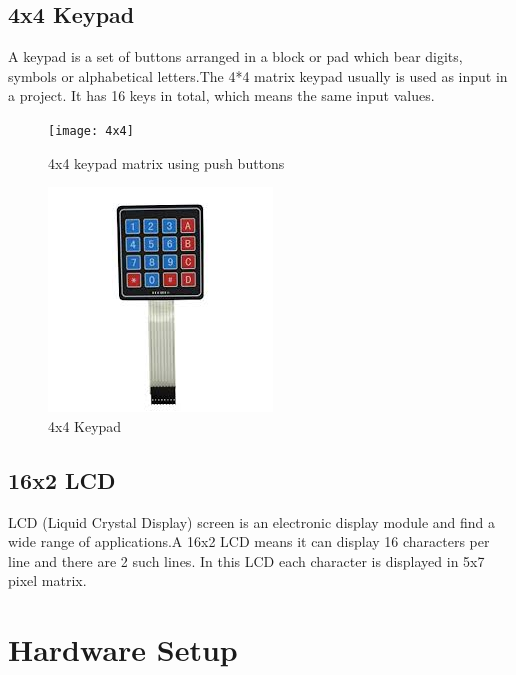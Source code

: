 \documentclass[11pt]{article}
\begin{document}
	\subsection{4x4 Keypad}	
		A keypad is a set of buttons arranged in a block or pad which bear digits, symbols or alphabetical letters.The 4*4 matrix keypad usually is used as input in a project. It has 16 keys in total, which means the same input values.
\begin{figure}[h]
	\begin{minipage}[b]{.5\linewidth}
		\centering
		\texttt{[image: 4x4]}
		\caption{ 4x4 keypad matrix using push buttons}
		\label{fig:1}
	\end{minipage}
  	\hspace{0.5cm}	
	\begin{minipage}[b]{.5\linewidth}
		\centering
		\includegraphics[scale=0.85]{keypad}
		\caption{4x4 Keypad}
		\label{fig:1}  
		\end{minipage}
\end{figure}

	\subsection{16x2 LCD}
		LCD (Liquid Crystal Display) screen is an electronic display module and find a wide range of applications.A 16x2 LCD means it can display 16 characters per line and there are 2 such lines. In this LCD each character is displayed in 5x7 pixel matrix.
		
\section{Hardware Setup}
\end{document}
